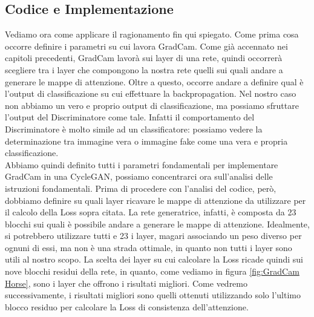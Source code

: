 \subsection{Codice e Implementazione}
Vediamo ora come applicare il ragionamento fin qui spiegato. Come prima cosa occorre definire i parametri su cui lavora GradCam. Come già accennato nei capitoli precedenti, GradCam lavorà sui layer di una rete, quindi occorrerà scegliere tra i layer che compongono la nostra rete quelli sui quali andare a generare le mappe di attenzione. Oltre a questo, occorre andare a definire qual è l'output di classificazione su cui effettuare la backpropagation. Nel nostro caso non abbiamo un vero e proprio output di classificazione, ma possiamo sfruttare l'output del Discriminatore come tale. Infatti il comportamento del Discriminatore è molto simile ad un classificatore: possiamo vedere la determinazione tra immagine vera o immagine fake come una vera e propria classificazione. 
\\Abbiamo quindi definito tutti i parametri fondamentali per implementare GradCam in una CycleGAN, possiamo concentrarci ora sull'analisi delle istruzioni fondamentali.
Prima di procedere con l'analisi del codice, però, dobbiamo definire su quali layer ricavare le mappe di attenzione da utilizzare per il calcolo della Loss sopra citata. La rete generatrice, infatti, è composta da 23 blocchi sui quali è possibile andare a generare le mappe di attenzione. Idealmente, si potrebbero utilizzare tutti e 23 i layer, magari associando un peso diverso per ognuni di essi, ma non è una strada ottimale, in quanto non tutti i layer sono utili al nostro scopo. La scelta dei layer su cui calcolare la Loss ricade quindi sui nove blocchi residui della rete, in quanto, come vediamo in figura \ref{fig:GradCam Horse},  sono i layer che offrono i risultati migliori. Come vedremo successivamente, i risultati migliori sono quelli ottenuti utilizzando solo l'ultimo blocco residuo per calcolare la Loss di consistenza dell'attenzione. 

